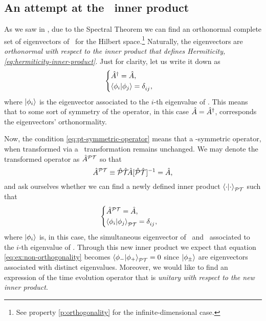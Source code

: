         \subsection{An attempt at the \PT\ inner product}
            As we saw in , due to the Spectral Theorem we can find an orthonormal complete set of eigenvectors of \hA\ for the Hilbert space.\footnote{See property \ref{p:orthogonality} for the infinite-dimensional case.} Naturally, the eigenvectors are \emph{orthonormal with respect to the inner product that defines Hermiticity, \eqref{eq:hermiticity-inner-product}}. Just for clarity, let us write it down as
            \begin{equation*}
                \begin{cases}
                    \hA^\dag = \hA
                    \mycomma \\
                    \braket{\phi_i}{\phi_j} = \tensor{\delta}{_i_j}
                    \mycomma
                \end{cases}
            \end{equation*}
            where $\ket{\phi_i}$ is the eigenvector associated to the $i$-th eigenvalue of \hA. This means that to some sort of symmetry of the operator, in this case $\hat{A} = \hat{A}^\dag$, corresponds the eigenvectors' orthonormality.

            Now, the condition \eqref{eq:pt-symmetric-operator} means that a \PT-symmetric operator, when transformed via a \PT\ transformation remains unchanged. We may denote the transformed operator as $\hat{A}^{\mathcal{P}\mathcal{T}}$ so that
            \begin{equation*}
                \hA^{\PT} \equiv \PTtransform{\hA} = \hA
                \mycomma
            \end{equation*}
            and ask ourselves whether we can find a newly defined inner product $\braket{\cdot}{\cdot}_{\mathcal{P}\mathcal{T}}$ such that
            \begin{equation*}
                \begin{cases}
                    \hA^{\PT} = \hA
                    \mycomma \\
                    \braket{\phi_i}{\phi_j}_{\PT} = \tensor{\delta}{_i_j}
                    \mycomma
                \end{cases}
            \end{equation*}
            where $\ket{\phi_i}$ is, in this case, the simultaneous eigenvector of \hA\ and \hPT\ associated to the $i$-th eigenvalue of \hA. Through this new inner product we expect that equation \eqref{eq:ex:non-orthogonality} becomes $\braket{\phi_-}{\phi_+}_{\mathcal{P}\mathcal{T}} = 0$ since $\ket{\phi_\pm}$ are eigenvectors associated with distinct eigenvalues. Moreover, we would like to find an expression of the time evolution operator that is \emph{unitary with respect to the new inner product}.


